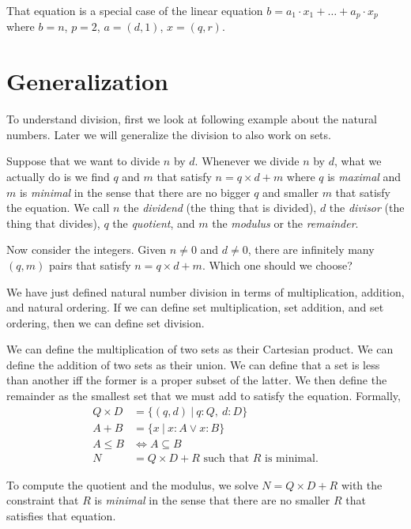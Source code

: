 That equation is a special case of the linear equation
\( b = a_1 \cdot x_1 + \ldots + a_p \cdot x_p \)
where \(b = n\), \(p = 2\), \(a = (d,1)\), \(x = (q,r)\).

\section{Generalization}

To understand division,
first we look at following example about the natural numbers.
Later we will generalize the division to also work on sets.

Suppose that we want to divide \(n\) by \(d\).
Whenever we divide \(n\) by \(d\),
what we actually do is we
find \(q\) and \(m\) that satisfy
\(n = q \times d + m\)
where \(q\) is \emph{maximal}
and \(m\) is \emph{minimal}
in the sense that there are no bigger \(q\) and smaller \(m\)
that satisfy the equation.
We call \(n\) the \emph{dividend} (the thing that is divided),
\(d\) the \emph{divisor} (the thing that divides),
\(q\) the \emph{quotient},
and \(m\) the \emph{modulus} or the \emph{remainder}.

Now consider the integers.
Given \(n \neq 0\) and \(d \neq 0\),
there are infinitely many \((q,m)\) pairs that satisfy \( n = q \times d + m \).
Which one should we choose?

We have just defined natural number division in terms of multiplication, addition, and natural ordering.
If we can define set multiplication, set addition, and set ordering, then we can define set division.

We can define the multiplication of two sets as their Cartesian product.
We can define the addition of two sets as their union.
We can define that a set is less than another iff the former is a proper subset of the latter.
We then define the remainder as the smallest set that we must add to satisfy the equation.
Formally,
\begin{align}
    Q \times D &= \{ (q,d) ~|~ q : Q, ~ d : D \}
    \\
    A + B &= \{ x ~|~ x : A \vee x : B \}
    \\
    A \le B &\iff A \subseteq B
    \\
    N &= Q \times D + R \text{ such that \(R\) is minimal.}
\end{align}

To compute the quotient and the modulus,
we solve \(N = Q \times D + R\)
with the constraint that \(R\) is \emph{minimal}
in the sense that there are no smaller \(R\)
that satisfies that equation.

